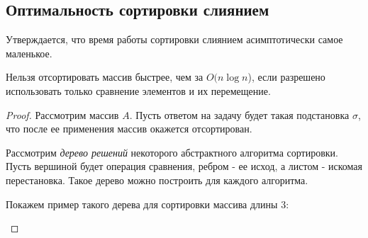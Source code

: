 \documentclass[../book.tex]{subfiles}
\begin{document}
	\subsection{Оптимальность сортировки слиянием}
	
	Утверждается, что время работы сортировки слиянием асимптотически самое маленькое.
	
	\begin{theorem}
		Нельзя отсортировать массив быстрее, чем за $O(n \log n$), если разрешено использовать только сравнение элементов и их перемещение.
	\end{theorem}
	
	
	\begin{proof}
		Рассмотрим массив $A$. Пусть ответом на задачу будет такая подстановка $\sigma$, что после ее применения массив окажется отсортирован.
		
		Рассмотрим \textit{дерево решений} некоторого абстрактного алгоритма сортировки. Пусть вершиной будет операция сравнения, ребром - ее исход, а листом - искомая перестановка. Такое дерево можно построить для каждого алгоритма. 
		
		Покажем пример такого дерева для сортировки массива длины 3:
		\begin{center}
\end{center}
\end{proof}
\end{document}

